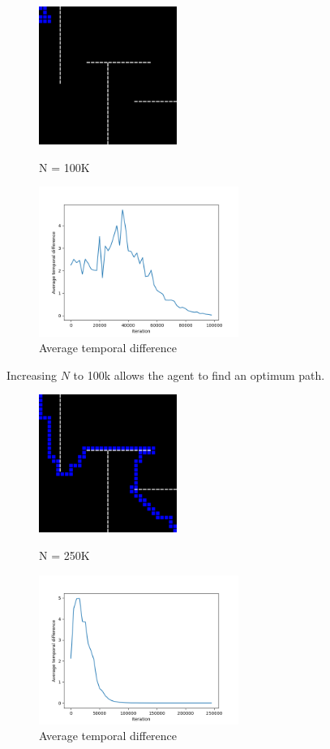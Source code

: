 \documentclass[]{article}
\begin{document}
\begin{figure}[ht]
	\centering
	\begin{minipage}[c]{0.3\linewidth}
		\includegraphics[width=4.5cm]{100kb}
		\caption{N = 100K}
	\end{minipage}
	\quad
	\begin{minipage}[c]{0.45\linewidth}
		\includegraphics[width=6.5cm]{100ka}
		\caption{Average temporal difference}
	\end{minipage}
\end{figure}

Increasing $N$ to 100k allows the agent to find an optimum path.

\begin{figure}[ht]
	\centering
	\begin{minipage}[c]{0.3\linewidth}
		\includegraphics[width=4.5cm]{250kb}
		\caption{N = 250K}
	\end{minipage}
\quad
\begin{minipage}[c]{0.45\linewidth}
	\includegraphics[width=6.5cm]{250ka}
	\caption{Average temporal difference}
\end{minipage}
\end{figure}
\end{document}
